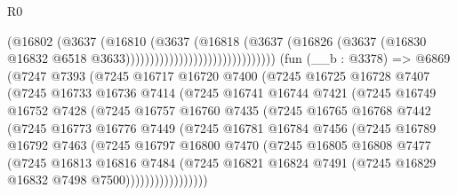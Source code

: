 \begin{lexlean}{R0}
\begin{coremodule}
                                                (@16802
                                                  (@3637
                                                    (@16810
                                                      (@3637
                                                        (@16818
                                                          (@3637
                                                            (@16826
                                                              (@3637
                                                                (@16830
                                                                  @16832
                                                                  @6518
                                                                  @3633)))))))))))))))))))))))))))))))
    (fun (__b : @3378) =>
    @6869
      (@7247
        @7393
        (@7245
          @16717
          @16720
          @7400
          (@7245
            @16725
            @16728
            @7407
            (@7245
              @16733
              @16736
              @7414
              (@7245
                @16741
                @16744
                @7421
                (@7245
                  @16749
                  @16752
                  @7428
                  (@7245
                    @16757
                    @16760
                    @7435
                    (@7245
                      @16765
                      @16768
                      @7442
                      (@7245
                        @16773
                        @16776
                        @7449
                        (@7245
                          @16781
                          @16784
                          @7456
                          (@7245
                            @16789
                            @16792
                            @7463
                            (@7245
                              @16797
                              @16800
                              @7470
                              (@7245
                                @16805
                                @16808
                                @7477
                                (@7245
                                  @16813
                                  @16816
                                  @7484
                                  (@7245
                                    @16821
                                    @16824
                                    @7491
                                    (@7245 @16829 @16832 @7498 @7500)))))))))))))))))

\end{coremodule}
\end{lexlean}
